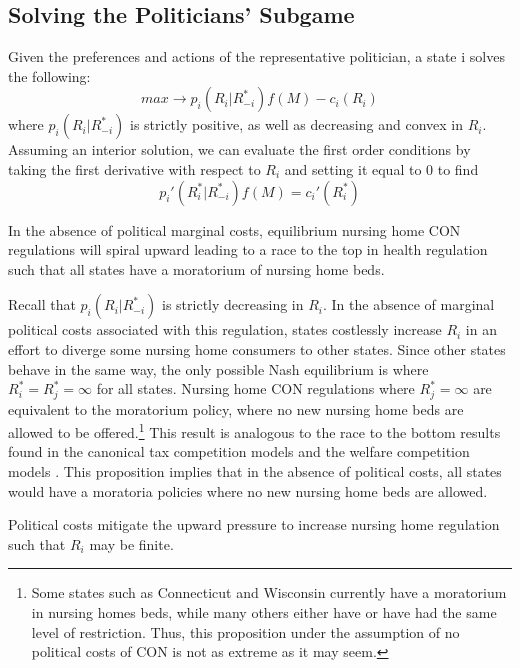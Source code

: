 \documentclass[../Main.tex]{subfiles}
\begin{document}
\subsection{Solving the Politicians' Subgame}

Given the preferences and actions of the representative politician, a state i solves the following:\begin{equation}max \rightarrow p_i(R_i|R_{-i}^*)f(M) -c_i(R_i)\end{equation} where $p_i(R_i|R_{-i}^*)$ is strictly positive, as well as decreasing and convex in $R_i$. Assuming an interior solution, we can evaluate the first order conditions by taking the first derivative with respect to $R_i$ and setting it equal to 0 to find \begin{equation}p_i'(R_i^*|R_{-i}^*)f(M) = c_i'(R_i^*)\end{equation} 

 \begin{Proposition}
In the absence of political marginal costs, equilibrium nursing home CON regulations will spiral upward leading to a race to the top in health regulation such that all states have a moratorium of nursing home beds. 
\end{Proposition}

Recall that $p_i(R_i|R_{-i}^*)$ is strictly decreasing in $R_i$. In the absence of marginal political costs associated with this regulation, states costlessly increase $R_i$ in an effort to diverge some nursing home consumers to other states. Since other states behave in the same way, the only possible Nash equilibrium is where $R_i^* = R_j^* = \infty $ for all states. Nursing home CON regulations where $R_j^* = \infty $ are equivalent to the moratorium policy, where no new nursing home beds are allowed to be offered.\footnote{Some states such as Connecticut and Wisconsin currently have a moratorium in nursing homes beds, while many others either have or have had the same level of restriction. Thus, this proposition under the assumption of no political costs of CON is not as extreme as it may seem.} This result is analogous to the race to the bottom results found in the canonical tax competition models \citep{zodrow1986pigou, basinger2004remodeling} and the welfare competition models \citep{gramlich1984migration,peterson1989american,schram1998without}. This proposition implies that in the absence of political costs, all states would have a moratoria policies where no new nursing home beds are allowed.


\begin{Proposition}
Political costs mitigate the upward pressure to increase nursing home regulation such that $R_i$ may be finite. 
\end{Proposition}
\end{document}
